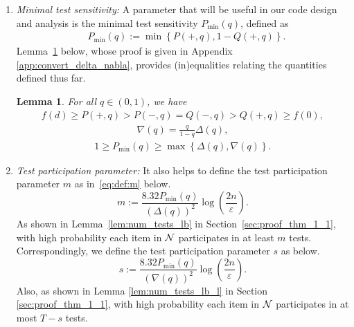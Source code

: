 \documentclass[onecolumn,letterpaper]{IEEEtran}
\newtheorem{lemma}{Lemma}
\newcommand{\cN}{{\cal N}}
\newcommand{\cp}{{q}}
\newcommand{\nt}{{m}}
\newcommand{\mo}{{s}}
\newcommand{\pn}{{P(-,\cp)}}
\newcommand{\pp}{{P(+,\cp)}}
\newcommand{\pmin}{{P_{\min}(\cp)}}
\newcommand{\pgap}{{\Delta(\cp)}}
\newcommand{\pnm}{{Q(-,\cp)}}
\newcommand{\ppm}{{Q(+,\cp)}}
\newcommand{\pgapm}{{\nabla(\cp)}}
\begin{document}
\begin{enumerate}
\item {\it Minimal test sensitivity:} A parameter that will be useful in our code design and analysis is the minimal test sensitivity $\pmin$, defined as
\begin{equation} \label{eq:def:Pmin}
\begin{aligned}
    &\pmin := \min\left\{ \pp,1-\ppm \right\}.
\end{aligned}
\end{equation}
Lemma~\ref{lem:relation:quantities} below, whose proof is given in Appendix \ref{app:convert_delta_nabla},
 provides (in)equalities relating the quantities defined thus far.
 \begin{lemma}
\label{lem:relation:quantities}
For all $\cp\in(0,1)$, we have
\begin{align}
\label{ineq:relation:P:Q}
    f(d)\ge  \pp > \pn = \pnm > \ppm \ge f(0),
\end{align}
\begin{align}
\label{eq:delta:convert}
    \pgapm = \frac{\cp}{1-\cp} \pgap,
\end{align}
\begin{align}
\label{eq:1>=pmin>max:Delta}
    1\geq \pmin \geq \max \left\{\pgap, \pgapm\right\}.
\end{align}
\end{lemma}




\item {\it Test participation parameter:} It also helps to define the test participation parameter $\nt$ as in~\eqref{eq:def:m} below.
%
\begin{equation}\label{eq:def:m}
    \nt := \frac{8.32\pmin}{\left(\pgap\right)^2} \log \left( \frac{2n}{\varepsilon } \right) .
\end{equation}
As shown in Lemma~\ref{lem:num_tests_lb} in Section~\ref{sec:proof_thm_1_1}, with high probability each item in $\cN$ participates in at least $\nt$ tests.
Correspondingly, we define the test participation parameter $\mo$ as below.
\begin{equation}
\label{eq:def:mo}
    \mo := \frac{8.32\pmin}{\left(\pgapm\right)^2} \log \left( \frac{2n}{\varepsilon } \right) .
\end{equation}
Also, as shown in Lemma \ref{lem:num_tests_lb_l} in Section \ref{sec:proof_thm_1_1}, with high probability each item in $\cN$ participates in at most $T-\mo$ tests.


\end{enumerate}
\end{document}
